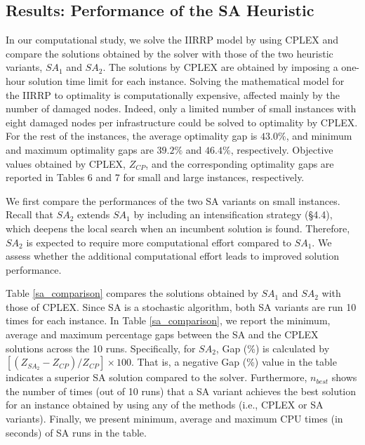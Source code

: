 \documentclass[11pt]{article}
\begin{document}


\subsection{Results: Performance of the SA Heuristic} \label{RIISRP_Solutions}

In our computational study, we solve the IIRRP model by using CPLEX and compare the solutions obtained by the solver with those of the two heuristic variants, $SA_{1}$ and $SA_{2}$. The solutions by CPLEX are obtained by imposing a one-hour solution time limit for each instance. Solving the mathematical model for the IIRRP to optimality is computationally expensive, affected mainly by the number of damaged nodes. Indeed, only a limited number of small instances with eight damaged nodes per infrastructure could be solved to optimality by CPLEX. For the rest of the instances, the average optimality gap is $43.0\%$, and minimum and maximum optimality gaps are $39.2\%$ and $46.4\%$, respectively. Objective values obtained by CPLEX, $Z_{CP}$, and the corresponding optimality gaps are reported in Tables 6 and 7 for small and large instances, respectively. 

We first compare the performances of the two SA variants on small instances. Recall that $SA_{2}$ extends $SA_{1}$ by including an intensification strategy (\S 4.4), which deepens the local search when an incumbent solution is found. Therefore, $SA_{2}$ is expected to require more computational effort compared to $SA_{1}$. We assess whether the additional computational effort leads to improved solution performance. 

Table \ref{sa_comparison} compares the solutions obtained by $SA_{1}$ and $SA_{2}$ with those of CPLEX. Since SA is a stochastic algorithm, both SA variants are run 10 times for each instance. In Table \ref{sa_comparison}, we report the minimum, average and maximum percentage gaps between the SA and the CPLEX solutions across the 10 runs. Specifically, for $SA_{2}$, Gap (\%) is calculated by $[(Z_{SA_{2}} - Z_{CP})/Z_{CP}] \times 100$. That is, a negative Gap (\%) value in the table indicates a superior SA solution compared to the solver. Furthermore, $n_{best}$ shows the number of times (out of 10 runs) that a SA variant achieves the best solution for an instance obtained by using any of the methods (i.e., CPLEX or SA variants). Finally, we present minimum, average and maximum CPU times (in seconds) of SA runs in the table.
\end{document}
